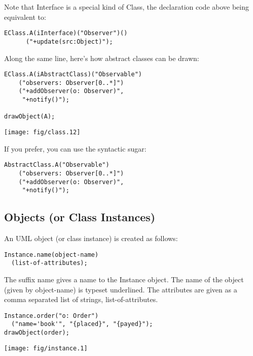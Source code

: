 \documentclass{article}
\newcommand{\code}{\ttfamily}
\begin{document}
Note that {\code Interface} is a special kind of {\code Class}, the declaration code above being equivalent to:
\begin{verbatim}
EClass.A(iInterface)("Observer")()
      ("+update(src:Object)");
\end{verbatim}

Along the same line, here's how abstract classes can be drawn:

\begin{multicols}{2}
\begin{verbatim}
EClass.A(iAbstractClass)("Observable")
    ("observers: Observer[0..*]")
    ("+addObserver(o: Observer)",
     "+notify()");

drawObject(A);
\end{verbatim}
\columnbreak
\hspace{1cm}\texttt{[image: fig/class.12]}
\end{multicols}

If you prefer, you can use the syntactic sugar:

\begin{verbatim}
AbstractClass.A("Observable")
    ("observers: Observer[0..*]")
    ("+addObserver(o: Observer)",
     "+notify()");
\end{verbatim}

\subsection{Objects (or Class Instances)}

An UML object (or class instance) is created as follows:

\begin{verbatim}
Instance.name(object-name)
  (list-of-attributes);
\end{verbatim}

The suffix {\code name} gives a name to the {\code Instance} object. The name of the object (given by {\code object-name}) is typeset underlined. The attributes are given as a comma separated list of strings, {\code list-of-attributes}.

\begin{multicols}{2}
\begin{verbatim}
Instance.order("o: Order")
  ("name='book'", "{placed}", "{payed}");
drawObject(order);
\end{verbatim}
\columnbreak
\hspace{2cm}\texttt{[image: fig/instance.1]}
\end{multicols}
\end{document}
